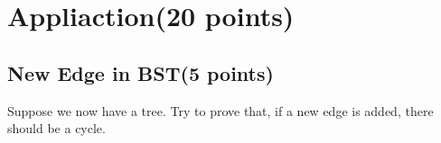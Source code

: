 \documentclass[11pt]{exam}
\begin{document}
\begin{solution}
    \\ \hspace*{\fill} \\
    \\ \hspace*{\fill} \\
    \\ \hspace*{\fill} \\
    \\ \hspace*{\fill} \\
    \\ \hspace*{\fill} \\
    \end{solution}

\section{Appliaction(20 points)}
    \subsection{New Edge in BST(5 points)}
    Suppose we now have a tree. Try to prove that, if a new edge is added, there should be a cycle.\par 
    \begin{solution}
    \\ \hspace*{\fill} \\
    \\ \hspace*{\fill} \\
    \\ \hspace*{\fill} \\
    \\ \hspace*{\fill} \\
    \\ \hspace*{\fill} \\
    \\ \hspace*{\fill} \\
    \\ \hspace*{\fill} \\
    \\ \hspace*{\fill} \\
    \\ \hspace*{\fill} \\
    \\ \hspace*{\fill} \\
    \\ \hspace*{\fill} \\
    \\ \hspace*{\fill} \\
    \end{solution}
    \newpage
\end{document}
